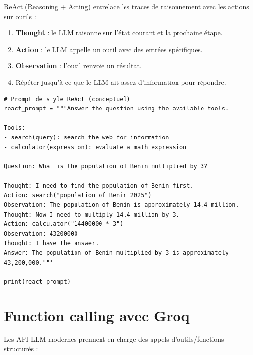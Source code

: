 ReAct (Reasoning + Acting) entrelace les traces de raisonnement avec les actions sur outils :

\begin{enumerate}
  \item \textbf{Thought} : le LLM raisonne sur l'\'etat courant et la prochaine \'etape.
  \item \textbf{Action} : le LLM appelle un outil avec des entr\'ees sp\'ecifiques.
  \item \textbf{Observation} : l'outil renvoie un r\'esultat.
  \item R\'ep\'eter jusqu'\`a ce que le LLM ait assez d'information pour r\'epondre.
\end{enumerate}

\begin{verbatim}
# Prompt de style ReAct (conceptuel)
react_prompt = """Answer the question using the available tools.

Tools:
- search(query): search the web for information
- calculator(expression): evaluate a math expression

Question: What is the population of Benin multiplied by 3?

Thought: I need to find the population of Benin first.
Action: search("population of Benin 2025")
Observation: The population of Benin is approximately 14.4 million.
Thought: Now I need to multiply 14.4 million by 3.
Action: calculator("14400000 * 3")
Observation: 43200000
Thought: I have the answer.
Answer: The population of Benin multiplied by 3 is approximately 43,200,000."""

print(react_prompt)
\end{verbatim}

\section{Function calling avec Groq}

Les API LLM modernes prennent en charge des appels d'outils/fonctions structur\'es :

